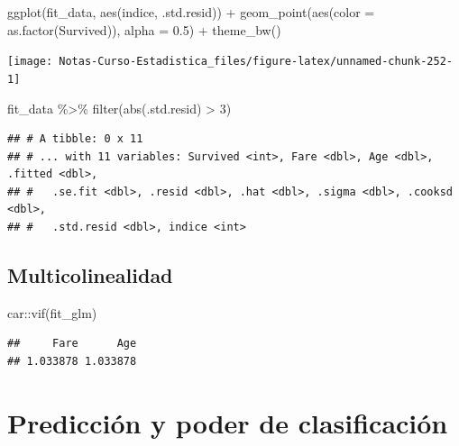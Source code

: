 \documentclass[
  12pt,
]{book}
\newenvironment{Shaded}{\begin{snugshade}}{\end{snugshade}}
\newcommand{\AttributeTok}[1]{\textcolor[rgb]{0.77,0.63,0.00}{#1}}
\newcommand{\DecValTok}[1]{\textcolor[rgb]{0.00,0.00,0.81}{#1}}
\newcommand{\FloatTok}[1]{\textcolor[rgb]{0.00,0.00,0.81}{#1}}
\newcommand{\FunctionTok}[1]{\textcolor[rgb]{0.00,0.00,0.00}{#1}}
\newcommand{\NormalTok}[1]{#1}
\newcommand{\SpecialCharTok}[1]{\textcolor[rgb]{0.00,0.00,0.00}{#1}}
\theoremstyle{definition}
\theoremstyle{definition}
\theoremstyle{definition}
\theoremstyle{remark}
\begin{document}
\begin{Shaded}
\begin{Highlighting}[]
\FunctionTok{ggplot}\NormalTok{(fit\_data, }\FunctionTok{aes}\NormalTok{(indice, .std.resid)) }\SpecialCharTok{+} \FunctionTok{geom\_point}\NormalTok{(}\FunctionTok{aes}\NormalTok{(}\AttributeTok{color =} \FunctionTok{as.factor}\NormalTok{(Survived)), }
    \AttributeTok{alpha =} \FloatTok{0.5}\NormalTok{) }\SpecialCharTok{+} \FunctionTok{theme\_bw}\NormalTok{()}
\end{Highlighting}
\end{Shaded}

\begin{center}\texttt{[image: Notas-Curso-Estadistica\_files/figure-latex/unnamed-chunk-252-1]} \end{center}

\begin{Shaded}
\begin{Highlighting}[]
\NormalTok{fit\_data }\SpecialCharTok{\%\textgreater{}\%} \FunctionTok{filter}\NormalTok{(}\FunctionTok{abs}\NormalTok{(.std.resid) }\SpecialCharTok{\textgreater{}} \DecValTok{3}\NormalTok{)}
\end{Highlighting}
\end{Shaded}

\begin{verbatim}
## # A tibble: 0 x 11
## # ... with 11 variables: Survived <int>, Fare <dbl>, Age <dbl>, .fitted <dbl>,
## #   .se.fit <dbl>, .resid <dbl>, .hat <dbl>, .sigma <dbl>, .cooksd <dbl>,
## #   .std.resid <dbl>, indice <int>
\end{verbatim}

\hypertarget{multicolinealidad-1}{%
\subsection{Multicolinealidad}\label{multicolinealidad-1}}

\begin{Shaded}
\begin{Highlighting}[]
\NormalTok{car}\SpecialCharTok{::}\FunctionTok{vif}\NormalTok{(fit\_glm)}
\end{Highlighting}
\end{Shaded}

\begin{verbatim}
##     Fare      Age 
## 1.033878 1.033878
\end{verbatim}

\hypertarget{predicciuxf3n-y-poder-de-clasificaciuxf3n}{%
\section{Predicción y poder de clasificación}\label{predicciuxf3n-y-poder-de-clasificaciuxf3n}}
\end{document}
